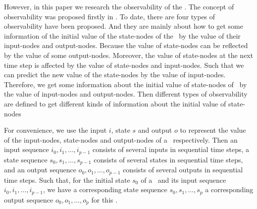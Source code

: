 However, in this paper we research the observability of the \BCNs. The concept of observability was proposed firstly in \cite{cheng2009controllability}. To date, there are four types of observability have been proposed. And they are mainly about how to get some information of the initial value of the state-nodes of the \BCNs\ by the value of their input-nodes and output-nodes. Because the value of state-nodes can be reflected by the value of some output-nodes. Moreover, the value of state-nodes at the next time step is affected by the value of state-nodes and input-nodes. Such that we can predict the new value of the state-nodes by the value of input-nodes. Therefore, we get some information about the initial value of state-nodes of \BCN\ by the value of input-nodes and output-nodes. Then different types of observability are defined to get different kinds of information about the initial value of state-nodes%

For convenience, we use the input $i$, state $s$ and output $o$ to represent the value of the input-nodes, state-nodes and output-nodes of a \BCN\ respectively. Then an input sequence $i_0, i_1,\ldots, i_{p-1}$ consists of several inputs in sequential time steps, a state sequence $s_0, s_1,\ldots, s_{p-1}$ consists of several states in sequential time steps, and an output sequence $o_0, o_1,\ldots, o_{p-1}$ consists of several outputs in sequential time steps. Such that, for the initial state $s_0$ of a \BCN\ and its input sequence $i_0, i_1,\ldots, i_{p-1}$, we have a corresponding state sequence $s_0, s_1,\ldots, s_{p}$ a corresponding output sequence $o_0, o_1,\ldots, o_{p}$ for this \BCN.

